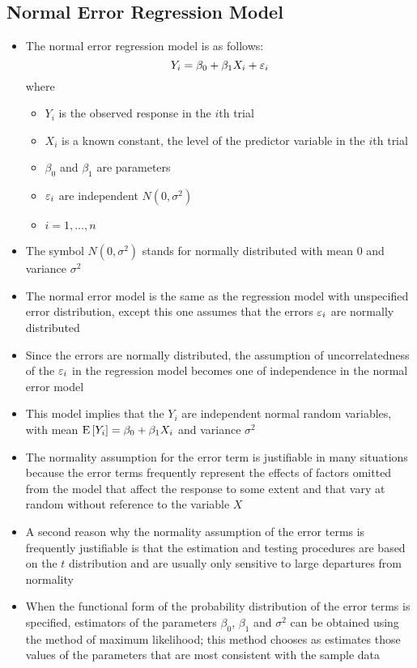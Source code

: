 \subsection{Normal Error Regression Model}
\begin{itemize}
\item The normal error regression model is as follows: $$ Y_i = \beta_0 + \beta_1X_i + \varepsilon_i $$ where \begin{itemize}[label={}]
\item $Y_i$ is the observed response in the $i$th trial
\item $X_i$ is a known constant, the level of the predictor variable in the $i$th trial
\item $\beta_0$ and $\beta_1$ are parameters
\item $\varepsilon_i$ are independent $N(0, \sigma^2)$
\item $i=1,\dots,n$ \end{itemize} 
\item The symbol $N(0, \sigma^2)$ stands for normally distributed with mean $0$ and variance $\sigma^2$
\item The normal error model is the same as the regression model with unspecified error distribution, except this one assumes that the errors $\varepsilon_i$ are normally distributed 
\item Since the errors are normally distributed, the assumption of uncorrelatedness of the $\varepsilon_i$ in the regression model becomes one of independence in the normal error model
\item This model implies that the $Y_i$ are independent normal random variables, with mean $\mathrm{E}\left[ Y_i \right] = \beta_0 + \beta_1X_i$ and variance $\sigma^2$ 
\item The normality assumption for the error term is justifiable in many situations because the error terms frequently represent the effects of factors omitted from the model that affect the response to some extent and that vary at random without reference to the variable $X$ 
\item A second reason why the normality assumption of the error terms is frequently justifiable is that the estimation and testing procedures are based on the $t$ distribution and are usually only sensitive to large departures from normality 
\item When the functional form of the probability distribution of the error terms is specified, estimators of the parameters $\beta_0$, $\beta_1$ and $\sigma^2$ can be obtained using the method of maximum likelihood; this method chooses as estimates those values of the parameters that are most consistent with the sample data

\end{itemize}

